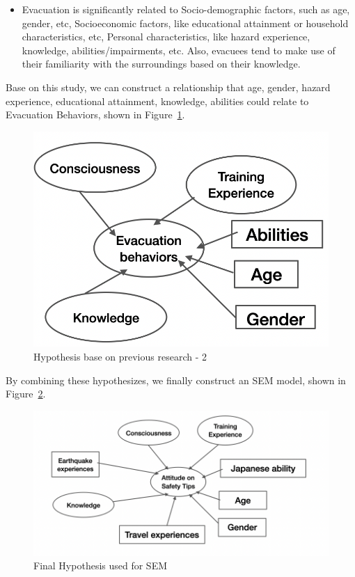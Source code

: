 \begin{itemize}
\item Evacuation is significantly related to Socio-demographic factors, such as age, gender, etc, Socioeconomic factors, like educational attainment or household characteristics, etc, Personal characteristics, like hazard experience, knowledge, abilities/impairments, etc. Also, evacuees tend to make use of their familiarity with the surroundings based on their knowledge.~\cite{Wang2021IncorporatingHF}
\end{itemize}

Base on this study, we can construct a relationship that age, gender, hazard experience,  educational attainment, knowledge, abilities could relate to Evacuation Behaviors, shown in Figure~\ref{fig8}. 

\begin{figure}[h]
  \includegraphics[width=0.5\linewidth]{Figure/Figure8.png}
  \centering
  \caption{Hypothesis base on previous research - 2 }
  \label{fig8}
\end{figure}

By combining these hypothesizes, we finally construct an SEM model, shown in Figure~\ref{fig9}. 

\begin{figure}[h]
  \includegraphics[width=\linewidth]{Figure/Figure9.png}
  \centering
  \caption{Final Hypothesis used for SEM }
  \label{fig9}
\end{figure}

